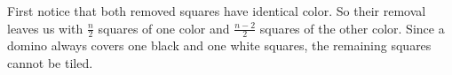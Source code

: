 \documentclass[11pt]{exam}
\begin{document}
\begin{questions}
\begin{center}
\end{center}

\begin{solution}
First notice that both removed squares have identical color. So their removal leaves us with $\frac{n}{2}$ squares of one color and $\frac{n-2}{2}$ squares of the other color. Since a domino always covers one black and one white squares, the remaining squares cannot be tiled.
\end{solution}


 
\end{questions}
\end{document}
